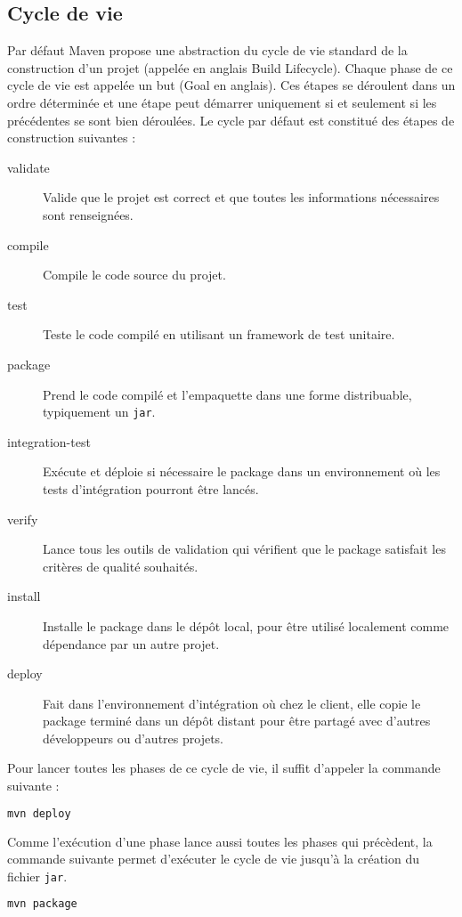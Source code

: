 \documentclass[a4paper,11pt]{article}
\begin{document}
\subsection{Cycle de vie}
Par défaut Maven propose une abstraction du cycle de vie standard de la construction d'un projet (appelée en anglais Build Lifecycle). 
Chaque phase de ce cycle de vie est appelée un but (Goal en anglais). Ces étapes se déroulent dans un ordre déterminée et 
une étape peut démarrer uniquement si et seulement si les précédentes se sont bien déroulées. Le cycle par défaut est constitué 
des étapes de construction suivantes :
\begin{description}
  \item[validate] Valide que le projet est correct et que toutes les informations nécessaires sont renseignées.
  \item[compile] Compile le code source du projet.
  \item[test] Teste le code compilé en utilisant un framework de test unitaire.
  \item[package] Prend le code compilé et l'empaquette dans une forme distribuable, typiquement un \texttt{jar}.
  \item[integration-test] Exécute et déploie si nécessaire le package dans un environnement où les tests d'intégration pourront être lancés.
  \item[verify] Lance tous les outils de validation qui  vérifient que le package satisfait les critères de qualité souhaités.
  \item[install] Installe le package dans le dépôt local, pour être utilisé localement comme dépendance par un autre projet.
  \item[deploy] Fait dans l'environnement d'intégration où chez le client, elle copie le package terminé dans un dépôt distant 
  pour être partagé avec d'autres développeurs ou d'autres projets.
\end{description}
Pour lancer toutes les phases de ce cycle de vie, il suffit d'appeler la commande suivante : 
\begin{lstlisting}[language=sh]
mvn deploy
\end{lstlisting}

Comme l'exécution d'une phase lance aussi toutes les phases qui précèdent, la commande suivante permet d'exécuter le cycle 
de vie jusqu'à la création du fichier \texttt{jar}.
\begin{lstlisting}[language=sh]
mvn package
\end{lstlisting}
\end{document}
